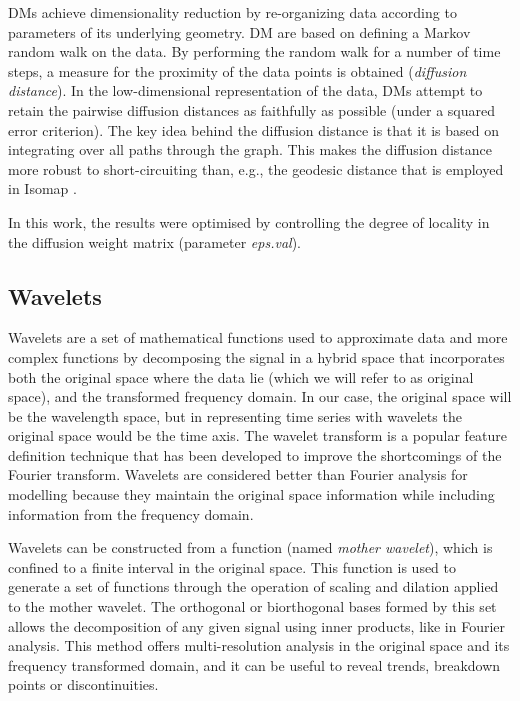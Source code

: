\documentclass[a4paper,fleqn,usenatbib]{mnras}
\begin{document}
{DMs achieve dimensionality reduction by re-organizing data according
to parameters of its underlying geometry. DM are based on defining a
Markov random walk on the data. By performing the random walk for a
number of time steps, a measure for the proximity of the data points
is obtained (\textit{diffusion distance}). In the low-dimensional
representation of the data, DMs attempt to retain the pairwise
diffusion distances as faithfully as possible (under a squared error
criterion). The key idea behind the diffusion distance is that it is
based on integrating over all paths through the graph. This makes the
diffusion distance more robust to short-circuiting than, e.g., the
geodesic distance that is employed in Isomap \citep{tenenbaum:00}.

In this work, the results were optimised by controlling the degree of
locality in the diffusion weight matrix (parameter \textit{eps.val}).

\subsection{Wavelets}

Wavelets \citep{mallat:98} are a set of mathematical functions used to
approximate data and more complex functions by decomposing the signal
in a hybrid space that incorporates both the original space where the
data lie (which we will refer to as original space), and the
transformed frequency domain. In our case, the original space will be
the wavelength space, but in representing time series with wavelets
the original space would be the time axis. The wavelet transform is a
popular feature definition technique that has been developed to
improve the shortcomings of the Fourier transform. Wavelets are
considered better than Fourier analysis for modelling because they
maintain the original space information while including information
from the frequency domain.

Wavelets can be constructed from a function (named \textit{mother
  wavelet}), which is confined to a finite interval in the original
space. This function is used to generate a set of functions through
the operation of scaling and dilation applied to the mother
wavelet. The orthogonal or biorthogonal bases formed by this set
allows the decomposition of any given signal using inner products,
like in Fourier analysis. This method offers multi-resolution analysis
in the original space and its frequency transformed domain, and it can
be useful to reveal trends, breakdown points or discontinuities.

}
\end{document}
